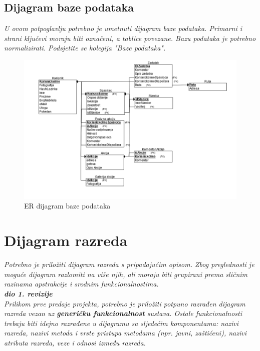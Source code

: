 				
			
			\subsection{Dijagram baze podataka}
				\textit{ U ovom potpoglavlju potrebno je umetnuti dijagram baze podataka. Primarni i strani ključevi moraju biti označeni, a tablice povezane. Bazu podataka je potrebno normalizirati. Podsjetite se kolegija "Baze podataka".}

				\begin{figure}[H]
					\includegraphics[scale=0.4]{slike/ModelBazePodataka.png} %
					\centering
					\caption{ER dijagram baze podataka}
					\label{fig:promjene}
				\end{figure}
			
			\eject
			
			
		\section{Dijagram razreda}
		
			\textit{Potrebno je priložiti dijagram razreda s pripadajućim opisom. Zbog preglednosti je moguće dijagram razlomiti na više njih, ali moraju biti grupirani prema sličnim razinama apstrakcije i srodnim funkcionalnostima.}\\
			
			\textbf{\textit{dio 1. revizije}}\\
			
			\textit{Prilikom prve predaje projekta, potrebno je priložiti potpuno razrađen dijagram razreda vezan uz \textbf{generičku funkcionalnost} sustava. Ostale funkcionalnosti trebaju biti idejno razrađene u dijagramu sa sljedećim komponentama: nazivi razreda, nazivi metoda i vrste pristupa metodama (npr. javni, zaštićeni), nazivi atributa razreda, veze i odnosi između razreda.}\\
			

